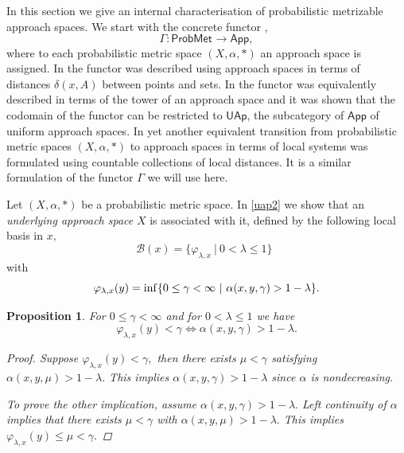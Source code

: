 \documentclass[12pt,a4paper]{amsart}
\theoremstyle{theorem}
\newtheorem{proposition}[theorem]{Proposition}
\theoremstyle{definition}
\newcommand{\bbb}{\ensuremath{\mathcal{B}}}
\newcommand{\app}{\ensuremath{\mathsf{App}}}
\newcommand{\PM}{\ensuremath{\mathsf{ProbMet_{}}}}
\newcommand{\uap}{\ensuremath{\mathsf{UAp}}}
\renewcommand{\inf}{\myinf}
\DeclareMathOperator*{\myinf}{in\vphantom{p}f}
\renewcommand{\a}{\ensuremath{\alpha}}
\renewcommand{\d}{\ensuremath{\delta}}
\renewcommand{\l}{\ensuremath{\lambda}}
\def\rw{\rightarrow}
\begin{document}
{In this section we give an internal characterisation of probabilistic metrizable approach spaces.
We start with the concrete functor  \cite{LSY}, \cite{CL}
\begin{equation}\label{faith}
\Gamma: \PM \rw \app,
\end{equation}
where to each probabilistic metric space $(X, \a, *)$ an approach space is assigned.
In \cite{LSY} the functor was described using approach spaces in terms of distances $\d(x,A)$  between points and sets. In \cite{CL} the functor was equivalently described in terms of the tower of an approach space and it was shown that the codomain of the functor can be restricted to $\uap$, the subcategory of $\app$ of uniform approach spaces.
In \cite{LSY} yet another equivalent transition from probabilistic metric spaces $(X, \a, *)$ to approach spaces in terms of local systems was formulated using countable collections of local distances.
It is a similar formulation of the functor $\Gamma$ we will use here.



Let $(X,\a,*)$ be a probabilistic metric space. In \ref{uap2} we show that an \emph{underlying approach space} $X$ is associated with it, defined by the following local basis in $x,$
\begin{equation}\label{associated}
\bbb(x) = \{ \varphi_{\l,x} \ | \ 0 < \l \leq 1 \} \ \ 
\end{equation}
with 
$$  \varphi_{\l,x} (y) = \inf \{ 0 \leq \gamma < \infty \ | \ \a(x,y,\gamma) > 1 - \l \}.$$




\begin{proposition}\label{}
For $0 \leq \gamma < \infty$ and for $0 < \l \leq 1$ we have
\begin{equation}\label{equivlocal}
\varphi_{\l,x} (y) < \gamma \Leftrightarrow \a(x,y,\gamma) > 1-\l.
\end{equation}
\begin{proof}
Suppose $\varphi_{\l,x} (y) < \gamma,$ then there exists $\mu < \gamma$ satisfying $\a(x,y,\mu) > 1-\l.$
This implies $\a(x,y,\gamma) > 1-\l$ since $\a$ is nondecreasing.

To prove the other implication, assume $\a(x,y,\gamma) > 1-\l.$ Left continuity of $\a$ implies that there exists $\mu < \gamma$ with $ \a(x,y,\mu) > 1-\l.$ This implies\\
 $\varphi_{\l,x} (y) \leq \mu < \gamma.$
\end{proof}
\end{proposition}

}
\end{document}
